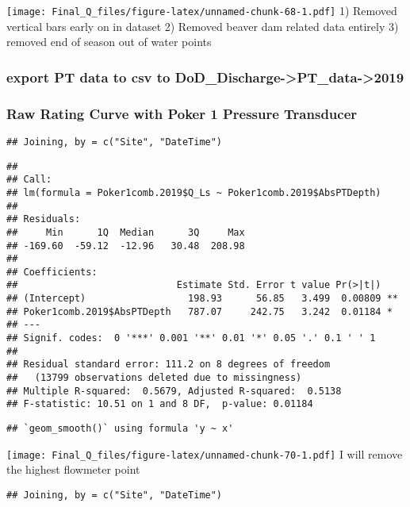 \documentclass[
]{article}
\begin{document}
\texttt{[image: Final\_Q\_files/figure-latex/unnamed-chunk-68-1.pdf]} 1)
Removed vertical bars early on in dataset 2) Removed beaver dam related
data entirely 3) removed end of season out of water points

\hypertarget{export-pt-data-to-csv-to-dod_discharge-pt_data-2019-2}{%
\subsubsection{export PT data to csv to
DoD\_Discharge-\textgreater PT\_data-\textgreater2019}\label{export-pt-data-to-csv-to-dod_discharge-pt_data-2019-2}}

\hypertarget{raw-rating-curve-with-poker-1-pressure-transducer}{%
\subsubsection{Raw Rating Curve with Poker 1 Pressure
Transducer}\label{raw-rating-curve-with-poker-1-pressure-transducer}}

\begin{verbatim}
## Joining, by = c("Site", "DateTime")
\end{verbatim}

\begin{verbatim}
## 
## Call:
## lm(formula = Poker1comb.2019$Q_Ls ~ Poker1comb.2019$AbsPTDepth)
## 
## Residuals:
##     Min      1Q  Median      3Q     Max 
## -169.60  -59.12  -12.96   30.48  208.98 
## 
## Coefficients:
##                            Estimate Std. Error t value Pr(>|t|)   
## (Intercept)                  198.93      56.85   3.499  0.00809 **
## Poker1comb.2019$AbsPTDepth   787.07     242.75   3.242  0.01184 * 
## ---
## Signif. codes:  0 '***' 0.001 '**' 0.01 '*' 0.05 '.' 0.1 ' ' 1
## 
## Residual standard error: 111.2 on 8 degrees of freedom
##   (13799 observations deleted due to missingness)
## Multiple R-squared:  0.5679, Adjusted R-squared:  0.5138 
## F-statistic: 10.51 on 1 and 8 DF,  p-value: 0.01184
\end{verbatim}

\begin{verbatim}
## `geom_smooth()` using formula 'y ~ x'
\end{verbatim}

\texttt{[image: Final\_Q\_files/figure-latex/unnamed-chunk-70-1.pdf]} I
will remove the highest flowmeter point

\begin{verbatim}
## Joining, by = c("Site", "DateTime")
\end{verbatim}
\end{document}
